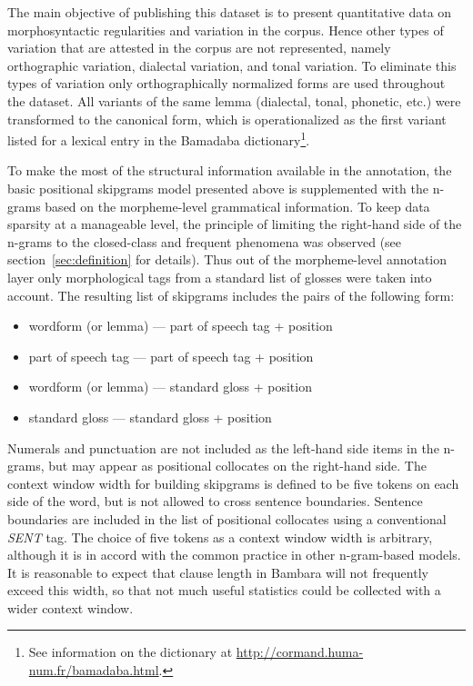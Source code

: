 \documentclass[12pt]{article}
\begin{document}
The main objective of publishing this dataset is to present
quantitative data on morphosyntactic regularities and variation in the
corpus. Hence other types of variation that are attested in the corpus
are not represented, namely orthographic variation, dialectal
variation, and tonal variation. To eliminate this types of variation
only orthographically normalized forms are used throughout the
dataset. All variants of the same lemma (dialectal, tonal, phonetic,
etc.) were transformed to the canonical form, which is
operationalized as the first variant listed for a lexical entry in the
Bamadaba dictionary\footnote{See information on the dictionary at \url{http://cormand.huma-num.fr/bamadaba.html}.}.

To make the most of the structural information available in the
annotation, the basic positional skipgrams model presented above is
supplemented with the n-grams based on the morpheme-level grammatical
information. To keep data sparsity at a manageable level, the principle
of limiting the right-hand side of the n-grams to the closed-class and
frequent phenomena was observed (see section~\ref{sec:definition} for
details). Thus out of the morpheme-level annotation layer only
morphological tags from a standard list of glosses were taken into
account. The resulting list of skipgrams includes the pairs of the
following form:
\begin{itemize}
\item wordform (or lemma) — part of speech tag + position
\item part of speech tag — part of speech tag + position
\item wordform (or lemma) — standard gloss + position
\item standard gloss — standard gloss + position
\end{itemize}
Numerals and punctuation are not included as the left-hand side items
in the n-grams, but may appear as positional collocates on the
right-hand side.  The context window width for building skipgrams is
defined to be five tokens on each side of the word, but is not allowed
to cross sentence boundaries.  Sentence boundaries are included in the
list of positional collocates using a conventional \textit{SENT} tag.
The choice of five tokens as a context window width is arbitrary,
although it is in accord with the common practice in other
n-gram-based models. It is reasonable to expect that clause length in
Bambara will not frequently exceed this width, so that not much useful
statistics could be collected with a wider context window.
\end{document}
